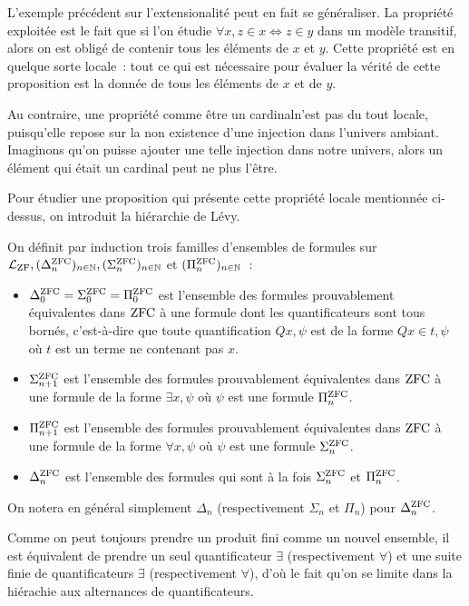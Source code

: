 L'exemple précédent sur l'extensionalité peut en fait se généraliser. La
propriété exploitée est le fait que si l'on étudie
$\forall x, z \in x \iff z \in y$ dans un modèle transitif, alors on est obligé
de contenir tous les éléments de $x$ et $y$. Cette propriété est en quelque
sorte locale~: tout ce qui est nécessaire pour évaluer la vérité de cette
proposition est la donnée de tous les éléments de $x$ et de $y$.

Au contraire, une propriété comme \og être un cardinal\fg n'est pas du tout
locale, puisqu'elle repose sur la non existence d'une injection dans l'univers
ambiant. Imaginons qu'on puisse ajouter une telle injection dans notre univers,
alors un élément qui était un cardinal peut ne plus l'être.

Pour étudier une proposition qui présente cette propriété locale mentionnée
ci-dessus, on introduit la hiérarchie de Lévy.

\begin{definition}
  On définit par induction trois familles d'ensembles de formules sur
  $\mathcal L_{\operatorname{ZF}}, (\Delta^{\operatorname{ZFC}}_n)_{n\in\mathbb N},
  (\Sigma^{\operatorname{ZFC}}_n)_{n\in\mathbb N}$
  et $(\Pi^{\operatorname{ZFC}}_n)_{n \in \mathbb N}$~:
  \begin{itemize}
  \item $\Delta^{\operatorname{ZFC}}_0=\Sigma^{\operatorname{ZFC}}_0=\Pi^{\operatorname{ZFC}}_0$ est l'ensemble des formules
    prouvablement équivalentes dans $\operatorname{ZFC}$ à une formule dont les
    quantificateurs sont tous bornés, c'est-à-dire que toute quantification
    $Q x, \psi$ est de la forme $Q x \in t, \psi$ où $t$ est un terme ne
    contenant pas $x$.
  \item $\Sigma^{\operatorname{ZFC}}_{n+1}$ est l'ensemble des formules prouvablement
    équivalentes
    dans $\operatorname{ZFC}$ à une formule de la forme
    $\exists x, \psi$ où $\psi$ est une formule $\Pi^{\operatorname{ZFC}}_n$.
  \item $\Pi^{\operatorname{ZFC}}_{n+1}$ est l'ensemble des formules prouvablement équivalentes
    dans $\operatorname{ZFC}$ à une formule de la forme $\forall x, \psi$ où $\psi$ est une
    formule $\Sigma^{\operatorname{ZFC}}_n$.
  \item $\Delta^{\operatorname{ZFC}}_n$ est l'ensemble des formules qui sont à la fois
    $\Sigma^{\operatorname{ZFC}}_n$ et $\Pi^{\operatorname{ZFC}}_n$.
  \end{itemize}

  On notera en général simplement $\Delta_n$ (respectivement $\Sigma_n$ et
  $\Pi_n$) pour $\Delta^{\operatorname{ZFC}}_n$.
\end{definition}

\begin{remark}
  Comme on peut toujours prendre un produit fini comme un nouvel ensemble, il
  est équivalent de prendre un seul quantificateur $\exists$ (respectivement
  $\forall$) et une suite finie de quantificateurs $\exists$ (respectivement
  $\forall$), d'où le fait qu'on se limite dans la hiérachie aux alternances
  de quantificateurs.
\end{remark}

